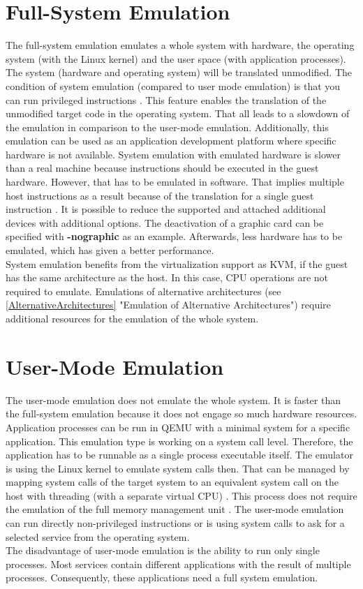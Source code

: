 \section{Full-System Emulation}

The full-system emulation emulates a whole system with hardware, the operating system (with the Linux kernel) and the user space (with application processes). 
The system (hardware and operating system) will be translated unmodified. The condition of system emulation (compared to user mode emulation) is that you can run privileged instructions \cite[~p.2]{Butt2011}. This feature enables the translation of the unmodified target code in the operating system.
That all leads to a slowdown of the emulation in comparison to the user-mode emulation.
Additionally, this emulation can be used as an application development platform where specific hardware is not available. 
System emulation with emulated hardware is slower than a real machine because instructions should be executed in the guest hardware.  However, that has to be emulated in software. 
That implies multiple host instructions as a result because of the translation for a single guest instruction \cite[~p.1]{Tong2014}.
It is possible to reduce the supported and attached additional devices with additional options. The deactivation of a graphic card can be specified with \textbf{-nographic} as an example. Afterwards, less hardware has to be emulated, which has given a better performance.  \\
System emulation benefits from the virtualization support as \gls{KVM}, if the guest has the same architecture as the host. In this case, CPU operations are not required to emulate. Emulations of alternative architectures (see \ref{AlternativeArchitectures} "Emulation of Alternative Architectures") require additional resources for the emulation of the whole system.

\section{User-Mode Emulation}

The user-mode emulation does not emulate the whole system. It is faster than the full-system emulation because it does not engage so much hardware resources. Application processes can be run in \gls{QEMU} with a minimal system for a specific application. 
This emulation type is working on a system call level. Therefore, the application has to be runnable as a single process executable itself. The emulator is using the Linux kernel to emulate system calls then. That can be managed by mapping system calls of the target system to an equivalent system call on the host with threading (with a separate virtual CPU) \cite{QEMU}. This process does not require the emulation of the full  memory  management  unit \cite[~p.2]{Butt2011}.
The user-mode emulation can run directly non-privileged instructions or is using system calls to ask for a selected service from the operating system. \\
The disadvantage of user-mode emulation is the ability to run only single processes. Most services contain different applications with the result of multiple processes. Consequently, these applications need a full system emulation.


